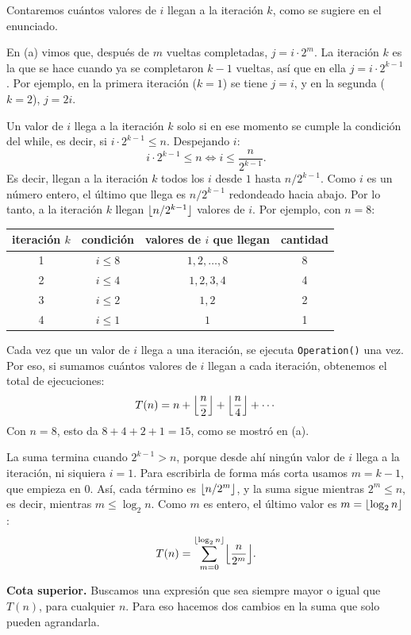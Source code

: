 Contaremos cuántos valores de $i$ llegan a la iteración $k$, como se sugiere en el
enunciado.

En (a) vimos que, después de $m$ vueltas completadas, $j = i \cdot 2^m$. La iteración $k$
es la que se hace cuando ya se completaron $k - 1$ vueltas, así que en ella
$j = i \cdot 2^{k-1}$. Por ejemplo, en la primera iteración ($k = 1$) se tiene $j = i$, y
en la segunda ($k = 2$), $j = 2i$.

Un valor de $i$ llega a la iteración $k$ solo si en ese momento se cumple la condición del
while, es decir, si $i \cdot 2^{k-1} \le n$. Despejando $i$:
\[
  i \cdot 2^{k-1} \le n \iff i \le \frac{n}{2^{k-1}}.
\]
Es decir, llegan a la iteración $k$ todos los $i$ desde $1$ hasta $n/2^{k-1}$. Como $i$
es un número entero, el último que llega es $n/2^{k-1}$ redondeado hacia abajo. Por lo
tanto, a la iteración $k$ llegan $\floor{n/2^{k-1}}$ valores de $i$. Por ejemplo, con
$n = 8$:
\begin{center}
\begin{tabular}{cccc}
  \toprule
  iteración $k$ & condición & valores de $i$ que llegan & cantidad \\
  \midrule
  1 & $i \le 8$ & $1, 2, \dots, 8$ & 8 \\
  2 & $i \le 4$ & $1, 2, 3, 4$     & 4 \\
  3 & $i \le 2$ & $1, 2$           & 2 \\
  4 & $i \le 1$ & $1$              & 1 \\
  \bottomrule
\end{tabular}
\end{center}

Cada vez que un valor de $i$ llega a una iteración, se ejecuta \texttt{Operation()} una
vez. Por eso, si sumamos cuántos valores de $i$ llegan a cada iteración, obtenemos el
total de ejecuciones:
\[
  T(n) = n + \floor*{\frac{n}{2}} + \floor*{\frac{n}{4}} + \cdots
\]
Con $n = 8$, esto da $8 + 4 + 2 + 1 = 15$, como se mostró en (a).

La suma termina cuando $2^{k-1} > n$, porque desde ahí ningún valor de $i$ llega a la
iteración, ni siquiera $i = 1$. Para escribirla de forma más corta usamos $m = k - 1$, que
empieza en $0$. Así, cada término es $\floor{n/2^m}$, y la suma sigue mientras
$2^m \le n$, es decir, mientras $m \le \log_2 n$. Como $m$ es entero, el último valor es
$m = \floor{\log_2 n}$:
\[
  T(n) = \sum_{m=0}^{\floor{\log_2 n}} \floor*{\frac{n}{2^m}}.
\]

\textbf{Cota superior.} Buscamos una expresión que sea siempre mayor o igual que
$T(n)$, para cualquier $n$. Para eso hacemos dos cambios en la suma que solo pueden
agrandarla.

